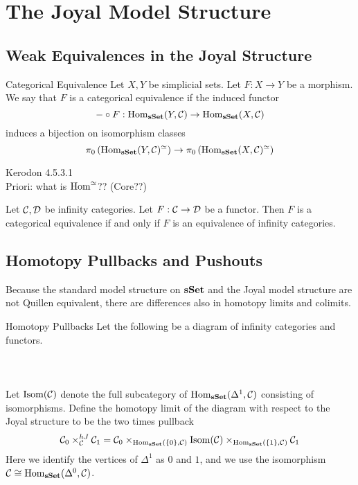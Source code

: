 \documentclass[a4paper]{article}
\begin{document}
\pagebreak
\section{The Joyal Model Structure}
\subsection{Weak Equivalences in the Joyal Structure}
\begin{defn}{Categorical Equivalence}{} Let $X,Y$ be simplicial sets. Let $F:X\to Y$ be a morphism. We say that $F$ is a categorical equivalence if the induced functor $$-\circ F:\operatorname{Hom}_\bold{sSet}(Y,\mathcal{C})\to\operatorname{Hom}_\bold{sSet}(X,\mathcal{C})$$ induces a bijection on isomorphism classes $$\pi_0\left(\operatorname{Hom}_\bold{sSet}(Y,\mathcal{C})^\simeq\right)\to\pi_0\left(\operatorname{Hom}_\bold{sSet}(X,\mathcal{C})^\simeq\right)$$
\end{defn}

Kerodon 4.5.3.1\\

Priori: what is $\operatorname{Hom}^\simeq$?? (Core??)

\begin{lmm}{}{} Let $\mathcal{C},\mathcal{D}$ be infinity categories. Let $F:\mathcal{C}\to\mathcal{D}$ be a functor. Then $F$ is a categorical equivalence if and only if $F$ is an equivalence of infinity categories. 
\end{lmm}

\subsection{Homotopy Pullbacks and Pushouts}
Because the standard model structure on $\bold{sSet}$ and the Joyal model structure are not Quillen equivalent, there are differences also in homotopy limits and colimits. 

\begin{defn}{Homotopy Pullbacks}{} Let the following be a diagram of infinity categories and functors. \\~\\
\\~\\
Let $\text{Isom}(\mathcal{C})$ denote the full subcategory of $\operatorname{Hom}_\bold{sSet}(\Delta^1,\mathcal{C})$ consisting of isomorphisms. Define the homotopy limit of the diagram with respect to the Joyal structure to be the two times pullback $$\mathcal{C}_0\times_{\mathcal{C}}^{hJ}\mathcal{C}_1=\mathcal{C}_0\times_{\operatorname{Hom}_\bold{sSet}(\{0\},\mathcal{C})}\text{Isom}(\mathcal{C})\times_{\operatorname{Hom}_\bold{sSet}(\{1\},\mathcal{C})}\mathcal{C}_1$$ Here we identify the vertices of $\Delta^1$ as $0$ and $1$, and we use the isomorphism $\mathcal{C}\cong\operatorname{Hom}_\bold{sSet}(\Delta^0,\mathcal{C})$. 
\end{defn}
\end{document}
